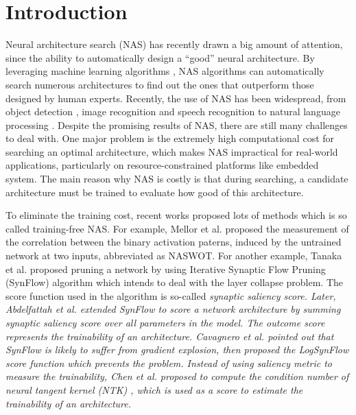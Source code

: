 \documentclass[sigconf]{acmart}
\begin{document}
\section{Introduction}
\label{sec:introduction}

    Neural architecture search (NAS) has recently drawn a big amount of 
    attention, since the ability to automatically design a ``good'' neural 
    architecture. By leveraging machine learning algorithms 
    \cite{https://doi.org/10.48550/arxiv.1611.01578}, NAS algorithms can 
    automatically search numerous architectures to find out the ones 
    that outperform those designed by human experts. Recently, the use of NAS has been widespread, 
    from object detection \cite{https://doi.org/10.48550/arxiv.2111.13336}, 
    image recognition \cite{https://doi.org/10.48550/arxiv.2006.04647} 
    and speech recognition \cite{https://doi.org/10.48550/arxiv.2011.05649} 
    to natural language processing \cite{jiang-etal-2019-improved}. 
    Despite the promising results of NAS, there are still many challenges 
    to deal with. One major problem is the extremely high computational %
    cost for searching an optimal architecture, which makes NAS 
    impractical for real-world applications, particularly on resource-constrained 
    platforms like embedded system. The main reason why NAS is costly is that 
    during searching, a candidate architecture must be trained to 
    evaluate how good of this architecture. 

    To eliminate the training cost, recent works proposed lots 
    of methods which is so called training-free NAS. 
    For example, Mellor et al. \cite{https://doi.org/10.48550/arxiv.2006.04647} 
    proposed the measurement of the correlation between the binary 
    activation paterns, induced by the untrained network at two inputs, 
    abbreviated as NASWOT. 
	For another example, Tanaka et al. proposed pruning a network by using 
    Iterative Synaptic Flow Pruning (SynFlow) algorithm 
    which intends to deal with the layer collapse problem. The score function 
	used in the algorithm is so-called \it{synaptic saliency} \rm{score}. 
	Later, Abdelfattah et al. 
    \cite{abdelfattah2021zerocost} extended SynFlow to score a network 
    architecture by summing synaptic saliency score over all parameters 
    in the model. The outcome score represents the trainability of an 
    architecture. Cavagnero et al. \cite{Cavagnero_2023} pointed out that 
    SynFlow is likely to suffer from gradient explosion, then proposed 
    the LogSynFlow score function which prevents the problem. 
    Instead of using saliency metric to measure the trainability, Chen et al. 
    \cite{https://doi.org/10.48550/arxiv.2102.11535} proposed to compute 
    the condition number of neural tangent kernel (NTK) 
    \cite{https://doi.org/10.48550/arxiv.2109.00817}, which is used as 
    a score to estimate the trainability of an architecture. 
\end{document}
